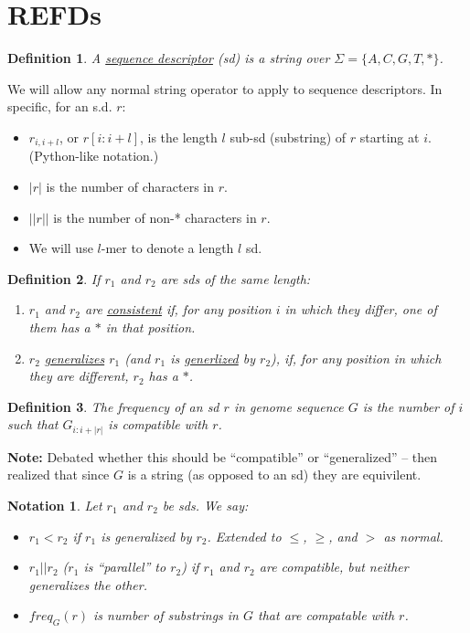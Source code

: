 \documentclass{article}
\newcommand{\und}{\underline}
\newtheorem{notation}{Notation}
\newtheorem{definition}{Definition}
\begin{document}
\section{REFDs}

\begin{definition}
  A \underline{sequence descriptor} (sd) is a string over $\Sigma=\{A,C,G,T,*\}$.
\end{definition}

We will allow any normal string operator to apply to sequence descriptors.  In specific, for an s.d. $r$:
\begin{itemize}
\item $r_{i,i+l}$, or $r[i:i+l]$, is the length $l$ sub-sd (substring) of $r$ starting at $i$.  (Python-like notation.)
\item $|r|$ is the number of characters in $r$.
\item $||r||$ is the number of non-* characters in $r$.
\item We will use $l$-mer to denote a length $l$ sd.
\end{itemize}

\begin{definition}
  If $r_1$ and $r_2$ are sds of the same length:
\begin{enumerate}
\item $r_1$ and $r_2$ are \und{consistent} if, for any position $i$ in
  which they differ, one of them has a $*$ in that position.
\item $r_2$ \und{generalizes} $r_1$ (and $r_1$ is \und{generlized} by $r_2$),
  if, for any position in which they are different, $r_2$ has a $*$.
  \end{enumerate}
\end{definition}

\begin{definition}
  The frequency of an sd $r$ in genome sequence $G$ is the number of
  $i$ such that $G_{i:i+|r|}$ is compatible with $r$.  
\end{definition}
{\bf Note:} Debated whether this should be ``compatible'' or ``generalized'' -- then realized that since $G$ is a string (as opposed to an sd) they are equivilent.


\begin{notation}
Let $r_1$ and $r_2$ be sds.  We say:
\begin{itemize}
\item $r_1 < r_2$ if $r_1$ is generalized by $r_2$.  Extended to
  $\leq$, $\geq$, and $>$ as normal. 
\item $r_1 || r_2$ ($r_1$ is ``parallel'' to $r_2$) if $r_1$ and $r_2$ are
  compatible, but neither generalizes the other.
\item $freq_G(r)$ is number of substrings in $G$ that are compatable with $r$.
\end{itemize}
\end{notation}
\end{document}
